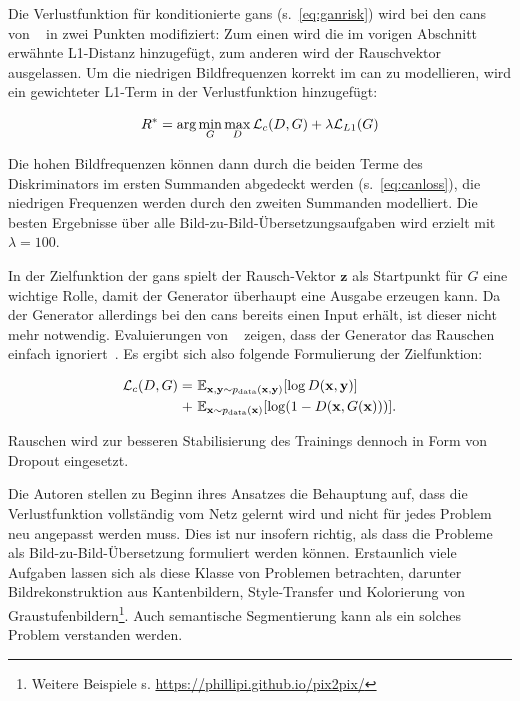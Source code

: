 Die Verlustfunktion für konditionierte \glspl{gan} (s.~\autoref{eq:ganrisk}) wird bei den \glspl{can} von \citeauthor{Isola.2017}~\cite{Isola.2017} in zwei Punkten modifiziert:
Zum einen wird die im vorigen Abschnitt erwähnte L1-Distanz hinzugefügt, zum anderen wird der Rauschvektor ausgelassen.
Um die niedrigen Bildfrequenzen korrekt im \gls{can} zu modellieren, wird ein gewichteter L1-Term in der Verlustfunktion hinzugefügt:

\begin{equation}
R^* = \textup{arg}\min_G \max_D \mathcal{L}_c(D, G) + \lambda \mathcal{L}_{L1}(G)
\end{equation}

Die hohen Bildfrequenzen können dann durch die beiden Terme des Diskriminators im ersten Summanden abgedeckt werden (s.~\autoref{eq:canloss}), die niedrigen Frequenzen werden durch den zweiten Summanden modelliert.
Die besten Ergebnisse über alle Bild-zu-Bild-Übersetzungsaufgaben wird erzielt mit $ \lambda = 100 $.

In der Zielfunktion der \glspl{gan} spielt der Rausch-Vektor $ \mathbf{z} $ als Startpunkt für $ G $ eine wichtige Rolle, damit der Generator überhaupt eine Ausgabe erzeugen kann.
Da der Generator allerdings bei den \glspl{can} bereits einen Input erhält, ist dieser nicht mehr notwendig.
Evaluierungen von \citeauthor{Isola.2017}~\cite{Isola.2017} zeigen, dass der Generator das Rauschen einfach ignoriert~\cite{Isola.2017}.
Es ergibt sich also folgende Formulierung der Zielfunktion:

\begin{equation}\label{eq:canlosswonoise}
\begin{split}
\mathcal{L}_c(D, G) = & \ \mathbb{E}_{\mathbf{x}, \mathbf{y} \sim p_{\textup{data}}(\mathbf{x}, \mathbf{y})} [\log D(\mathbf{x}, \mathbf{y})] \\
+ & \ \mathbb{E}_{\mathbf{x} \sim p_{\textup{data}}(\mathbf{x})} [\log(1 - D(\mathbf{x}, G(\mathbf{x})))].
\end{split}
\end{equation}

Rauschen wird zur besseren Stabilisierung des Trainings dennoch in Form von Dropout eingesetzt.

Die Autoren stellen zu Beginn ihres Ansatzes die Behauptung auf, dass die Verlustfunktion vollständig vom Netz gelernt wird und nicht für jedes Problem neu angepasst werden muss.
Dies ist nur insofern richtig, als dass die Probleme als Bild-zu-Bild-Übersetzung formuliert werden können.
Erstaunlich viele Aufgaben lassen sich als diese Klasse von Problemen betrachten, darunter Bildrekonstruktion aus Kantenbildern, Style-Transfer und Kolorierung von Graustufenbildern\footnote{Weitere Beispiele s. \url{https://phillipi.github.io/pix2pix/}}.
Auch semantische Segmentierung kann als ein solches Problem verstanden werden.



